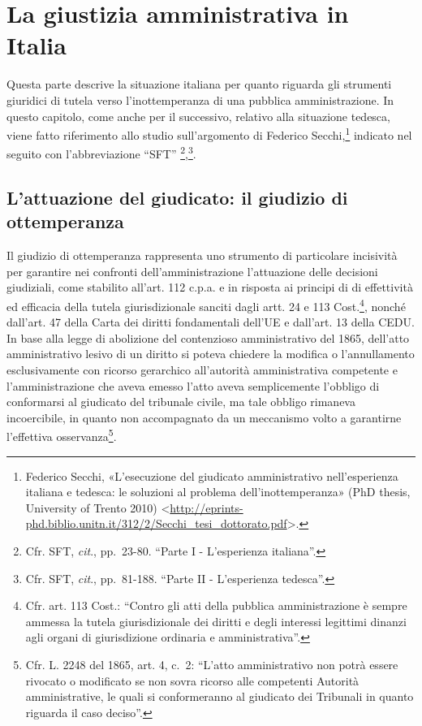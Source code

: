 \documentclass[12pt,it,a4paper,]{report}
\begin{document}
\begin{tabbing}
\end{tabbing}
\newpage

\setcounter{page}{1}
\doublespacing
\setlength{\parindent}{0.5in}

\hypertarget{la-giustizia-amministrativa-in-italia}{%
\chapter{La giustizia amministrativa in
Italia}\label{la-giustizia-amministrativa-in-italia}}

Questa parte descrive la situazione italiana per quanto riguarda gli
strumenti giuridici di tutela verso l'inottemperanza di una pubblica
amministrazione. In questo capitolo, come anche per il successivo,
relativo alla situazione tedesca, viene fatto riferimento allo studio
sull'argomento di Federico Secchi,\footnote{Federico Secchi,
  {«L'esecuzione del giudicato amministrativo nell'esperienza italiana e
  tedesca: le soluzioni al problema dell'inottemperanza»} (PhD thesis,
  University of Trento 2010)
  \textless{}\url{http://eprints-phd.biblio.unitn.it/312/2/Secchi_tesi_dottorato.pdf}\textgreater.}
indicato nel seguito con l'abbreviazione ``SFT''
\footnote{Cfr. SFT, \emph{cit}., pp.~23-80. ``Parte I - L'esperienza
  italiana''.},\footnote{Cfr. SFT, \emph{cit}., pp.~81-188. ``Parte II -
  L'esperienza tedesca''.}.

\hypertarget{lattuazione-del-giudicato-il-giudizio-di-ottemperanza}{%
\section{L'attuazione del giudicato: il giudizio di
ottemperanza}\label{lattuazione-del-giudicato-il-giudizio-di-ottemperanza}}

Il giudizio di ottemperanza rappresenta uno strumento di particolare
incisività per garantire nei confronti dell'amministrazione l'attuazione
delle decisioni giudiziali, come stabilito all'art. 112 c.p.a. e in
risposta ai principi di di effettività ed efficacia della tutela
giurisdizionale sanciti dagli artt. 24 e 113 Cost.\footnote{Cfr. art.
  113 Cost.: ``Contro gli atti della pubblica amministrazione è sempre
  ammessa la tutela giurisdizionale dei diritti e degli interessi
  legittimi dinanzi agli organi di giurisdizione ordinaria e
  amministrativa''.}, nonché dall'art. 47 della Carta dei diritti
fondamentali dell'UE e dall'art. 13 della CEDU. In base alla legge di
abolizione del contenzioso amministrativo del 1865, dell'atto
amministrativo lesivo di un diritto si poteva chiedere la modifica o
l'annullamento esclusivamente con ricorso gerarchico all'autorità
amministrativa competente e l'amministrazione che aveva emesso l'atto
aveva semplicemente l'obbligo di conformarsi al giudicato del tribunale
civile, ma tale obbligo rimaneva incoercibile, in quanto non
accompagnato da un meccanismo volto a garantirne l'effettiva
osservanza\footnote{Cfr. L. 2248 del 1865, art. 4, c.~2: ``L'atto
  amministrativo non potrà essere rivocato o modificato se non sovra
  ricorso alle competenti Autorità amministrative, le quali si
  conformeranno al giudicato dei Tribunali in quanto riguarda il caso
  deciso''.}.
\end{document}
